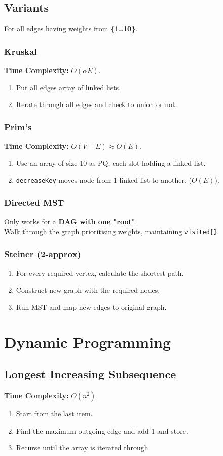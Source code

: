 \documentclass[10pt,landscape,a4paper]{article}
\begin{document}
\begin{multicols*}{4}
\subsection{Variants}
For all edges having weights from \textbf{\{1..10\}}.
\subsubsection{Kruskal}
\textbf{Time Complexity:} $O(\alpha E)$.
\begin{enumerate}
    \item Put all edges array of linked lists.
    \item Iterate through all edges and check to union or not.
\end{enumerate}

\subsubsection{Prim's}
\textbf{Time Complexity:} $O(V + E) \approx O(E)$.
\begin{enumerate}
    \item Use an array of size 10 as PQ, each slot holding a linked list.
    \item \texttt{decreaseKey} moves node from 1 linked list to another. ($O(E)$).
\end{enumerate}

\subsubsection{Directed MST}
Only works for a \textbf{DAG with one "root"}. \\
Walk through the graph prioritising weights, maintaining \texttt{visited[]}. 

\subsubsection{Steiner (2-approx)}
\begin{enumerate}
    \item For every required vertex, calculate the shortest path.
    \item Construct new graph with the required nodes.
    \item Run MST and map new edges to original graph.
\end{enumerate}



\section{Dynamic Programming}

\subsection{Longest Increasing Subsequence}
\textbf{Time Complexity:} $O(n^2)$.
\begin{enumerate}
    \item Start from the last item.
    \item Find the maximum outgoing edge and add 1 and store.
    \item Recurse until the array is iterated through
\end{enumerate}

\end{multicols*}
\end{document}
